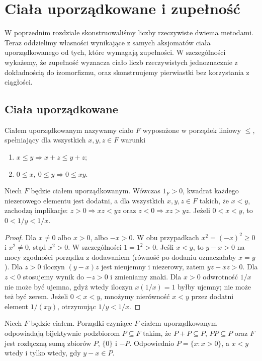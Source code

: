 \chapter{Ciała uporządkowane i zupełność}
\label{ma1:ch:ordered-fields}

W poprzednim rozdziale skonstruowaliśmy liczby rzeczywiste dwiema metodami. Teraz oddzielimy własności wynikające z samych aksjomatów ciała uporządkowanego od tych, które wymagają zupełności. W szczególności wykażemy, że zupełność wyznacza ciało liczb rzeczywistych jednoznacznie z dokładnością do izomorfizmu, oraz skonstruujemy pierwiastki bez korzystania z ciągłości.

\section{Ciała uporządkowane}
\begin{definicja}
\label{ma1:def:ordered-field}
Ciałem uporządkowanym nazywamy ciało $F$ wyposażone w porządek liniowy $\le$, spełniający dla wszystkich $x,y,z\in F$ warunki
\begin{enumerate}[label=(\roman*)]
\item $x\le y\Longrightarrow x+z\le y+z$;
\item $0\le x,\ 0\le y\Longrightarrow 0\le xy$.
\end{enumerate}
\end{definicja}
\begin{lemat}
\label{ma1:lem:ordered-rules}
Niech $F$ będzie ciałem uporządkowanym. Wówczas $1_F>0$, kwadrat każdego niezerowego elementu jest dodatni, a dla wszystkich $x,y,z\in F$ takich, że $x<y$, zachodzą implikacje: $z>0\Rightarrow xz<yz$ oraz $z<0\Rightarrow xz>yz$. Jeżeli $0<x<y$, to $0<1/y<1/x$.
\end{lemat}
\begin{proof}
Dla $x\ne0$ albo $x>0$, albo $-x>0$. W obu przypadkach $x^2=(-x)^2\ge0$ i $x^2\ne0$, stąd $x^2>0$. W szczególności $1=1^2>0$. Jeśli $x<y$, to $y-x>0$ na mocy zgodności porządku z dodawaniem (równość po dodaniu oznaczałaby $x=y$). Dla $z>0$ iloczyn $(y-x)z$ jest nieujemny i niezerowy, zatem $yz-xz>0$. Dla $z<0$ stosujemy wynik do $-z>0$ i zmieniamy znaki.
Dla $x>0$ odwrotność $1/x$ nie może być ujemna, gdyż wtedy iloczyn $x(1/x)=1$ byłby ujemny; nie może też być zerem. Jeżeli $0<x<y$, mnożymy nierówność $x<y$ przez dodatni element $1/(xy)$, otrzymując $1/y<1/x$.
\end{proof}
\begin{twierdzenie}
\label{ma1:thm:positive-cone}
Niech $F$ będzie ciałem. Porządki czyniące $F$ ciałem uporządkowanym odpowiadają bijektywnie podzbiorom $P\subseteq F$ takim, że $P+P\subseteq P$, $PP\subseteq P$ oraz $F$ jest rozłączną sumą zbiorów $P$, $\{0\}$ i $-P$. Odpowiednio $P=\{x:x>0\}$, a $x<y$ wtedy i tylko wtedy, gdy $y-x\in P$.
\end{twierdzenie}
